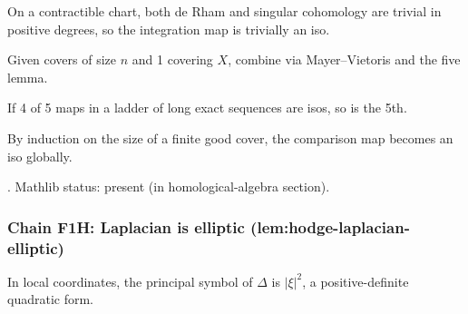 \begin{lemma}
\label{lem:dfl-r1}
On a contractible chart, both de Rham and singular cohomology are trivial in positive degrees, so the integration map is trivially an iso.
\leanok
\end{lemma}

\begin{lemma}
\label{lem:dfl-r2}
Given covers of size $n$ and 1 covering $X$, combine via Mayer--Vietoris and the five lemma.
\leanok
\end{lemma}

\begin{lemma}
\label{lem:dfl-r3}
If 4 of 5 maps in a ladder of long exact sequences are isos, so is the 5th.
\leanok\mathlibok
\end{lemma}

\begin{lemma}
\label{lem:dfl-r4}
By induction on the size of a finite good cover, the comparison map becomes an iso globally.
\leanok
\end{lemma}

\begin{lemma}
\label{lem:dfl-r5}
.  Mathlib status: present (in homological-algebra section).
\leanok\mathlibok
\end{lemma}

\subsubsection*{Chain F1H: Laplacian is elliptic (lem:hodge-laplacian-elliptic)}

\begin{lemma}
\label{lem:hle-r1}
In local coordinates, the principal symbol of $\Delta$ is $|\xi|^{2}$, a positive-definite quadratic form.
\leanok
\end{lemma}

